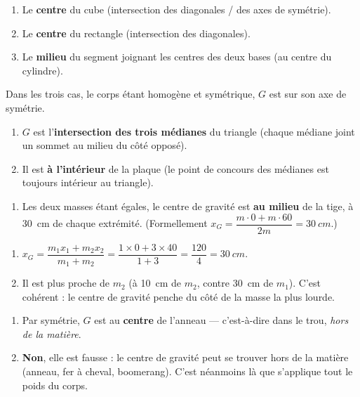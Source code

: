 \documentclass[11pt,a4paper]{article}
\begin{document}
\begin{corrige}
\begin{enumerate}[label=\alph*)]
  \item Le \textbf{centre} du cube (intersection des diagonales / des axes de symétrie).
  \item Le \textbf{centre} du rectangle (intersection des diagonales).
  \item Le \textbf{milieu} du segment joignant les centres des deux bases (au centre du cylindre).
\end{enumerate}
Dans les trois cas, le corps étant homogène et symétrique, $G$ est sur son axe de symétrie.
\end{corrige}

\begin{corrige}[le triangle]
\begin{enumerate}[label=\alph*)]
  \item $G$ est l'\textbf{intersection des trois médianes} du triangle (chaque médiane joint un sommet
        au milieu du côté opposé).
  \item Il est \textbf{à l'intérieur} de la plaque (le point de concours des médianes est toujours
        intérieur au triangle).
\end{enumerate}
\end{corrige}

\begin{corrige}
\begin{enumerate}[label=\alph*)]
  \item Les deux masses étant égales, le centre de gravité est \textbf{au milieu} de la tige, à
        \qty{30}{cm} de chaque extrémité. (Formellement $x_G=\dfrac{m\cdot 0 + m\cdot 60}{2m}=\qty{30}{cm}$.)
\end{enumerate}
\end{corrige}

\begin{corrige}
\begin{enumerate}[label=\alph*)]
  \item $x_G = \dfrac{m_1 x_1 + m_2 x_2}{m_1+m_2} = \dfrac{1\times 0 + 3\times 40}{1+3}
        = \dfrac{120}{4} = \qty{30}{cm}$.
  \item Il est plus proche de $m_2$ (à \qty{10}{cm} de $m_2$, contre \qty{30}{cm} de $m_1$).
        C'est cohérent : le centre de gravité penche du côté de la masse la plus lourde.
\end{enumerate}
\end{corrige}

\begin{corrige}
\begin{enumerate}[label=\alph*)]
  \item Par symétrie, $G$ est au \textbf{centre} de l'anneau — c'est-à-dire dans le trou, \emph{hors de
        la matière}.
  \item \textbf{Non}, elle est fausse : le centre de gravité peut se trouver hors de la matière (anneau,
        fer à cheval, boomerang). C'est néanmoins là que s'applique tout le poids du corps.
\end{enumerate}
\end{corrige}
\end{document}
